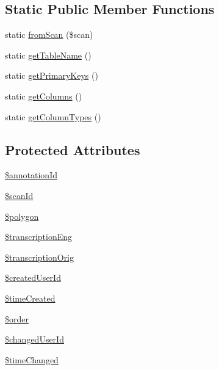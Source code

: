 \subsection*{Static Public Member Functions}
\begin{DoxyCompactItemize}
\item 
static \hyperlink{classAnnotation_a7c5fdcc3bcb0502df6512a6613507458}{fromScan} (\$scan)
\item 
static \hyperlink{classAnnotation_a9bc4933ab99e52e31b622a9829edd4bb}{getTableName} ()
\item 
static \hyperlink{classAnnotation_a8676c5ad1cf917a17cc70bb8c816437c}{getPrimaryKeys} ()
\item 
static \hyperlink{classAnnotation_a9e9b41c456e409ae6223258c4ba1fb94}{getColumns} ()
\item 
static \hyperlink{classAnnotation_a0081ac8f6cf11cce9ca0e6e4ed5d9ffc}{getColumnTypes} ()
\end{DoxyCompactItemize}
\subsection*{Protected Attributes}
\begin{DoxyCompactItemize}
\item 
\hyperlink{classAnnotation_a7dc0510e40f9b6108be80f3aef415148}{\$annotationId}
\item 
\hyperlink{classAnnotation_ab056a07bc1b1f5c3df2c08dadfaf9396}{\$scanId}
\item 
\hyperlink{classAnnotation_a6a9416473fa3c1a8f071d8303fcf2093}{\$polygon}
\item 
\hyperlink{classAnnotation_a6e3f1b607ba4f17cb01ea41d0cc98b4e}{\$transcriptionEng}
\item 
\hyperlink{classAnnotation_a93dabd9816dace28738c2b1a9d4c785d}{\$transcriptionOrig}
\item 
\hyperlink{classAnnotation_a910abade9cc597b887cc80d211a0a951}{\$createdUserId}
\item 
\hyperlink{classAnnotation_ac3fbdd99078ea6e158999df4ea336257}{\$timeCreated}
\item 
\hyperlink{classAnnotation_a2b06cc7e7fc220f58b94f45cb89cd223}{\$order}
\item 
\hyperlink{classAnnotation_ae36f98c3c0cf771ec6a6a25c23235eb5}{\$changedUserId}
\item 
\hyperlink{classAnnotation_abb6ccb1464aaa142027c645658e25915}{\$timeChanged}
\end{DoxyCompactItemize}


